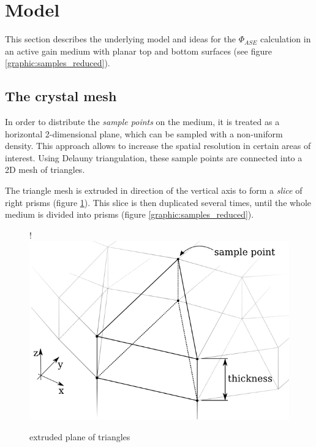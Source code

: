 \section{Model}

This section describes the underlying model and ideas for the $\Phi_{ASE}$
calculation in an active gain medium with planar top and bottom surfaces (see
figure \ref{graphic:samples_reduced}).



\subsection{The crystal mesh} \label{subsec:meshSampling}

In order to distribute the \emph{sample points} on the medium, it is treated as
a horizontal 2-dimensional plane, which can be sampled with a non-uniform
density. This approach allows to increase the spatial resolution in certain
areas of interest. Using Delauny triangulation, these sample points are
connected into a 2D mesh of triangles.

The triangle mesh is extruded in direction of the vertical axis to form a
\emph{slice} of right prisms (figure \ref{graphic:extruded_mesh}). This
slice is then duplicated several times, until the whole medium is divided into
prisms (figure \ref{graphic:samples_reduced}).

\begin{figure}
  \centerline{
     {!} {\includegraphics{graphics/delauny_3.png}}
  }
  \caption{extruded plane of triangles}
  \label{graphic:extruded_mesh}
\end{figure}

